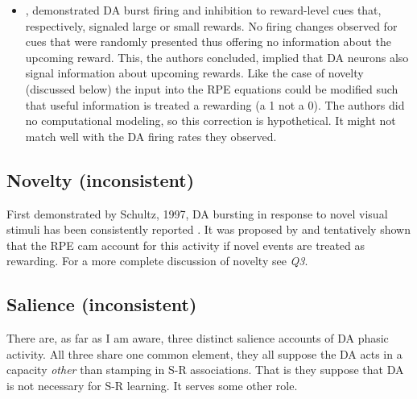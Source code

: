 \documentclass[doc]{apa}        %
\begin{document}
\begin{itemize}
\item {}, demonstrated DA burst firing and inhibition to reward-level cues that, respectively, signaled large or small rewards.  No firing changes observed for cues that were randomly presented thus offering no information about the upcoming reward.  This, the authors concluded, implied that DA neurons also signal information about upcoming rewards.  Like the case of novelty (discussed below) the input into the RPE equations could be modified such that useful information is treated a rewarding (a 1 not a 0).  The authors did no computational modeling, so this correction is hypothetical.  It might not match well with the DA firing rates they observed.
\end{itemize}

\subsection{Novelty (inconsistent)} %
\label{sub:novelty}
First demonstrated by Schultz, 1997, DA bursting in response to novel visual stimuli has been consistently reported \cite{Blatter:2006p6372, Wittmann:2007p3328, GuitartMasip:2010p7227}.  It was proposed by \cite{Kakade:2002p6414} and tentatively shown \cite{GuitartMasip:2010p7227} that the RPE cam account for this activity if novel events are treated as rewarding.  For a more complete discussion of novelty see \emph{Q3}.

\subsection{Salience (inconsistent)} %
\label{sub:salience}
There are, as far as I am aware, three distinct salience accounts of DA phasic activity. All three share one common element, they all suppose the DA acts in a capacity \emph{other} than stamping in S-R associations.  That is they suppose that DA is not necessary for S-R learning.  It serves some other role.
\end{document}
